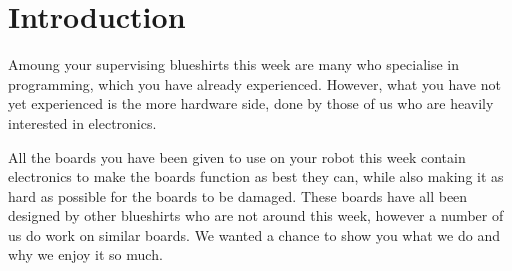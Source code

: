 \section{Introduction}
Amoung your supervising blueshirts this week are many who specialise in programming, which you have already experienced.
However, what you have not yet experienced is the more hardware side, done by those of us who are heavily interested in electronics.

All the boards you have been given to use on your robot this week contain electronics to make the boards function as best they can, while also making it as hard as possible for the boards to be damaged.
These boards have all been designed by other blueshirts who are not around this week, however a number of us do work on similar boards.
We wanted a chance to show you what we do and why we enjoy it so much.
